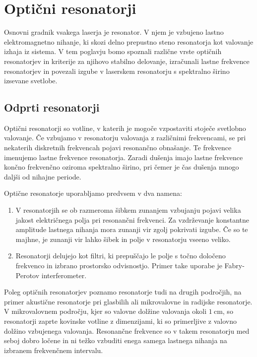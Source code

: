 
\chapter{Optični resonatorji}
Osnovni gradnik vsakega laserja je resonator. V njem je vzbujeno lastno elektromagnetno
nihanje, ki skozi delno prepustno steno resonatorja kot valovanje
izhaja iz sistema. V tem poglavju bomo 
spoznali različne vrste optičnih resonatorjev in kriterije za njihovo stabilno delovanje,
izračunali lastne frekvence resonatorjev in povezali izgube v laserskem resonatorju s
spektralno širino izsevane svetlobe.

\section{Odprti resonatorji}
Optični resonatorji so votline, v katerih je mogoče 
vzpostaviti stoječe svetlobno valovanje. Če vzbujamo v resonatorju valovanja z 
različnimi frekvencami, se pri nekaterih diskretnih frekvencah pojavi resonančno
obnašanje. Te frekvence imenujemo lastne frekvence
resonatorja. Zaradi dušenja imajo lastne frekvence končno frekvenčno oziroma spektralno 
širino, pri čemer je čas dušenja mnogo daljši od nihajne periode. 

Optične resonatorje uporabljamo predvsem v dva namena:
\begin{enumerate}
\item V resonatorjih se ob razmeroma šibkem zunanjem vzbujanju pojavi velika jakost
električnega polja pri resonančni frekvenci. Za vzdrževanje
konstantne amplitude lastnega nihanja mora zunanji vir zgolj pokrivati izgube. 
Če so te majhne, je zunanji vir lahko šibek in polje
v resonatorju vseeno veliko.
\item Resonatorji delujejo kot filtri, ki prepuščajo le polje s točno  
določeno frekvenco in izbrano prostorsko odvisnostjo. Primer take uporabe je 
Fabry-Perotov interferometer. 
\end{enumerate}

\begin{remark}
Poleg optičnih resonatorjev poznamo resonatorje tudi na drugih področjih, 
na primer akustične resonatorje pri glasbilih ali mikrovalovne in radijske resonatorje. 
V mikrovalovnem področju, kjer so valovne dolžine valovanja
okoli $1~\si{\centi\metre}$, 
so resonatorji zaprte kovinske votline z dimenzijami, ki so primerljive z 
valovno dolžino vzbujenega valovanja. Resonančne frekvence so v takem resonatorju 
med seboj dobro ločene in ni težko vzbuditi enega samega lastnega nihanja na izbranem 
frekvenčnem intervalu.
\end{remark}

